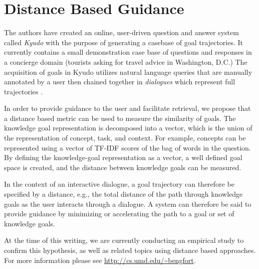 \documentclass[letterpaper]{article}
\begin{document}
\section{Distance Based Guidance}

The authors have created an online, user-driven question and answer system called \textit{Kyudo} with the purpose of generating a casebase of goal trajectories. It currently contains a small demonstration case base of questions and responses in a concierge domain (tourists asking for travel advice in Washington, D.C.) The acquisition of goals in Kyudo utilizes natural language queries that are manually annotated by a user then chained together in \textit{dialogues} which represent full trajectories \cite{bengfort_interactive_2015}.

In order to provide guidance to the user and facilitate retrieval, we propose that a distance based metric can be used to measure the similarity of goals. The knowledge goal representation is decomposed into a vector, which is the union of the representation of concept, task, and context. For example, concepts can be represented using a vector of TF-IDF scores of the bag of words in the question. By defining the knowledge-goal representation as a vector, a well defined goal space is created, and the distance between knowledge goals can be measured.

In the context of an interactive dialogue, a goal trajectory can therefore be specified by a distance, e.g., the total distance of the path through knowledge goals as the user interacts through a dialogue. A system can therefore be said to provide guidance by minimizing or accelerating the path to a goal or set of knowledge goals.

At the time of this writing, we are currently conducting an empirical study to confirm this hypothesis, as well as related topics using distance based approaches. For more information please see \url{http://cs.umd.edu/~bengfort}.



\end{document}
